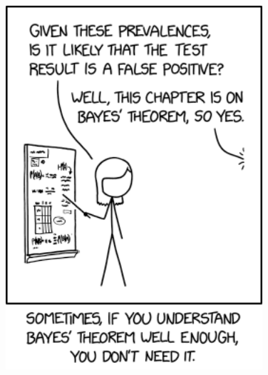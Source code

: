 \documentclass[
  ignorenonframetext,
  aspectratio=169]{beamer}
\begin{document}
\begin{frame}
\begin{center}\includegraphics[width=3.75in]{img/bayes_theorem} \end{center}
\end{frame}
\end{document}

